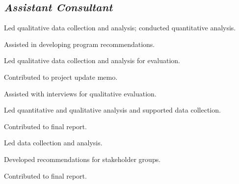 \subsection{\textit{Assistant Consultant}}
\begin{cvtable}
        {\color{cvsectioncolor}{Penn State Acoustics Program}}
        {}
        {\begin{tightitemize}
            \item Led qualitative data collection and analysis; conducted quantitative analysis.
            \item Assisted in developing program recommendations.
        \end{tightitemize}}
        {\color{cvsectioncolor}{RIEF - Virtual Community of Practice}}
        {}
        {\begin{tightitemize}
            \item Led qualitative data collection and analysis for evaluation.
            \item Contributed to project update memo.
        \end{tightitemize}}
    \cvitem{}
        {\color{cvsectioncolor}{IGE - Personalized Learning Module for Graduate STEM Education}}
        {}
        {\begin{tightitemize}
            \item Assisted with interviews for qualitative evaluation.
        \end{tightitemize}}  
        {\color{cvsectioncolor}{Engineering Education and Research Centers}}
        {}
        {\begin{tightitemize}
            \item Led quantitative and qualitative analysis and supported data collection.
            \item Contributed to final report.
        \end{tightitemize}}
    \cvitem{}
        {\color{cvsectioncolor}{Capacity Building for Research at Minority Serving Institutions}}
        {}
        {\begin{tightitemize}
            \item Led data collection and analysis.
            \item Developed recommendations for stakeholder groups.
            \item Contributed to final report.
        \end{tightitemize}}
\end{cvtable}